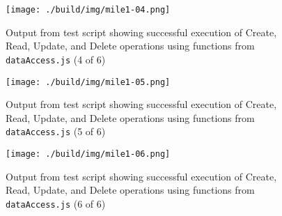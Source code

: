 \begin{figure}[htbp]
  \texttt{[image: ./build/img/mile1-04.png]}
  \caption{Output from test script showing successful execution of Create, Read,
    Update, and Delete operations using functions from \texttt{dataAccess.js} (4
    of 6)}
  \label{fig:exec4}
\end{figure}

\begin{figure}[htbp]
  \texttt{[image: ./build/img/mile1-05.png]}
  \caption{Output from test script showing successful execution of Create, Read,
    Update, and Delete operations using functions from \texttt{dataAccess.js} (5
    of 6)}
  \label{fig:exec5}
\end{figure}

\begin{figure}[htbp]
  \texttt{[image: ./build/img/mile1-06.png]}
  \caption{Output from test script showing successful execution of Create, Read,
    Update, and Delete operations using functions from \texttt{dataAccess.js} (6
    of 6)}
  \label{fig:exec6}
\end{figure}

